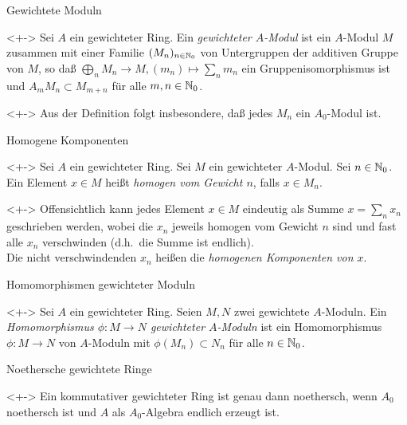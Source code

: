 \begin{frame}{Gewichtete Moduln}
	\begin{definition}<+->
		Sei \(A\) ein gewichteter Ring. Ein \emph{gewichteter \(A\)-Modul} ist
		ein \(A\)-Modul \(M\) zusammen mit einer Familie \((M_n)_{n \in \mathbb N_0}\)
		von Untergruppen der additiven Gruppe von \(M\), so daß
		\(\bigoplus\limits_n M_n \to M, (m_n) \mapsto \sum\limits_n m_n\)
		ein Gruppenisomorphismus ist und \(A_m M_n \subset M_{m + n}\)
		für alle \(m, n \in \mathbb N_0\).
	\end{definition}
	\begin{visibleenv}<+->
		Aus der Definition folgt insbesondere, daß jedes \(M_n\) ein \(A_0\)-Modul
		ist.
	\end{visibleenv}
\end{frame}

\begin{frame}{Homogene Komponenten}
	\begin{definition}<+->
		Sei \(A\) ein gewichteter Ring. Sei \(M\) ein gewichteter \(A\)-Modul. 
		Sei \(n \in \mathbb N_0\). Ein Element \(x \in M\) heißt \emph{homogen vom
		Gewicht \(n\)}, falls \(x \in M_n\).
	\end{definition}
	\begin{visibleenv}<+->
		Offensichtlich kann jedes Element \(x \in M\) eindeutig als Summe
		\(x = \sum\limits_n x_n\) geschrieben werden, wobei die \(x_n\) jeweils
		homogen vom Gewicht \(n\) sind und fast alle \(x_n\) verschwinden
		(d.h.\ die Summe ist endlich).
		\\
		Die nicht verschwindenden \(x_n\) heißen die \emph{homogenen Komponenten
		von \(x\)}.
	\end{visibleenv}
\end{frame}

\begin{frame}{Homomorphismen gewichteter Moduln}
	\begin{definition}<+->
		Sei \(A\) ein gewichteter Ring. Seien \(M, N\) zwei gewichtete \(A\)-Moduln.
		Ein \emph{Homomorphismus \(\phi\colon M \to N\) gewichteter \(A\)-Moduln}
		ist ein Homomorphismus \(\phi\colon M \to N\) von \(A\)-Moduln mit
		\(\phi(M_n) \subset N_n\) für alle \(n \in \mathbb N_0\).
	\end{definition}
\end{frame}

\begin{frame}{Noethersche gewichtete Ringe}
	\begin{proposition}<+->
		Ein kommutativer gewichteter Ring ist genau dann noethersch, wenn
		\(A_0\) noethersch ist und \(A\) als \(A_0\)-Algebra endlich erzeugt ist.
	\end{proposition}
\end{frame}

